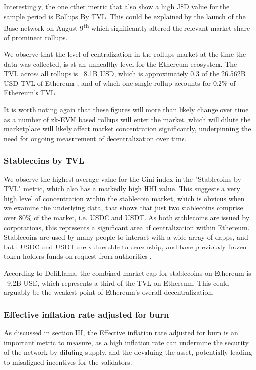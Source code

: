 \documentclass[conference]{IEEEtran}
\begin{document}
Interestingly, the one other metric that also show a high JSD value for the sample period is Rollups By TVL.  This could be explained by the launch of the Base network on August 9\textsuperscript{th} which significantly altered the relevant market share of prominent rollups.

We observe that the level of centralization in the rollups market at the time the data was collected, is at an unhealthy level for the Ethereum ecosystem.  The TVL across all rollups is ~8.1B USD, which is approximately 0.3 of the 26.562B USD TVL of Ethereum \cite{defillama}, and of which one single rollup accounts for 0.2\% of Ethereum's TVL.

It is worth noting again that these figures will more than likely change over time as a number of zk-EVM based rollups will enter the market, which will dilute the marketplace will likely affect market concentration significantly, underpinning the need for ongoing measurement of decentralization over time.

\subsubsection{Stablecoins by TVL}

We observe the highest average value for the Gini index in the "Stablecoins by TVL" metric, which also has a markedly high HHI value.  This suggests a very high level of concentration within the stablecoin market, which is obvious when we examine the underlying data, that shows that just two stablecoins comprise over 80\% of the market, i.e. USDC and USDT. As both stablecoins are issued by corporations, this represents a significant area of centralization within Ethereum.  Stablecoins are used by many people to interact with a wide array of dapps, and both USDC and USDT are vulnerable to censorship, and have previously frozen token holders funds on request from authorities \cite{haqshanas2022} \cite{de2022}.

According to DefiLlama\cite{defillama}, the combined market cap for stablecoins on Ethereum is ~9.2B USD, which represents a third of the TVL on Ethereum.  This could arguably be the weakest point of Ethereum's overall decentralization.

\subsubsection{Effective inflation rate adjusted for burn}

As discussed in section III, the Effective inflation rate adjusted for burn is an important metric to measure, as a high inflation rate can undermine the security of the network by diluting supply, and the devaluing the asset, potentially leading to misaligned incentives for the validators.
\end{document}
